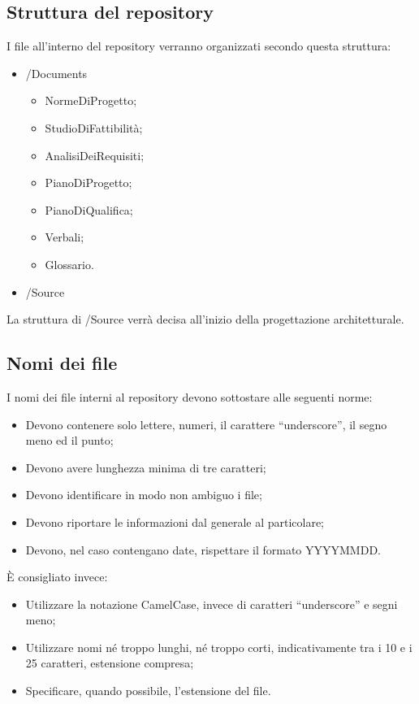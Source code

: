 \documentclass[../NormeProgetto.tex]{subfiles}
\begin{document}
	\subsection{Struttura del repository}
	I file all'interno del repository verranno organizzati secondo questa struttura:
	\begin{itemize}
		\item /Documents
		\begin{itemize}
			\item NormeDiProgetto;
			\item StudioDiFattibilità;
			\item AnalisiDeiRequisiti;
			\item PianoDiProgetto;
			\item PianoDiQualifica;
			\item Verbali;
			\item Glossario.
		\end{itemize}
		\item /Source
	\end{itemize}
	La struttura di /Source verrà decisa all'inizio della progettazione architetturale.
	\subsection{Nomi dei file}
	I nomi dei file interni al repository devono sottostare alle seguenti norme:
	\begin{itemize}
		\item Devono contenere solo lettere, numeri, il carattere ``underscore'', il segno meno ed il punto;
		\item Devono avere lunghezza minima di tre caratteri;
		\item Devono identificare in modo non ambiguo i file;
		\item Devono riportare le informazioni dal generale al particolare;
		\item Devono, nel caso contengano date, rispettare il formato YYYYMMDD.
	\end{itemize}
	È consigliato invece:
	\begin{itemize}
		\item Utilizzare la notazione CamelCase, invece di caratteri ``underscore'' e segni meno;
		\item Utilizzare nomi né troppo lunghi, né troppo corti, indicativamente tra i 10 e i 25 caratteri, estensione compresa;
		\item Specificare, quando possibile, l'estensione del file.
	\end{itemize}
\end{document}
